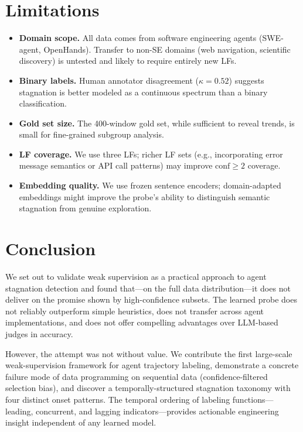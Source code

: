 \documentclass[11pt]{article}
\begin{document}
\section{Limitations}
\label{sec:limitations}

\begin{itemize}
\item \textbf{Domain scope.} All data comes from software engineering agents (SWE-agent, OpenHands). Transfer to non-SE domains (web navigation, scientific discovery) is untested and likely to require entirely new LFs.
\item \textbf{Binary labels.} Human annotator disagreement ($\kappa\!=\!0.52$) suggests stagnation is better modeled as a continuous spectrum than a binary classification.
\item \textbf{Gold set size.} The 400-window gold set, while sufficient to reveal trends, is small for fine-grained subgroup analysis.
\item \textbf{LF coverage.} We use three LFs; richer LF sets (e.g., incorporating error message semantics or API call patterns) may improve $\text{conf}\!\geq\!2$ coverage.
\item \textbf{Embedding quality.} We use frozen sentence encoders; domain-adapted embeddings might improve the probe's ability to distinguish semantic stagnation from genuine exploration.
\end{itemize}

\section{Conclusion}
\label{sec:conclusion}

We set out to validate weak supervision as a practical approach to agent stagnation detection and found that---on the full data distribution---it does not deliver on the promise shown by high-confidence subsets.
The learned probe does not reliably outperform simple heuristics, does not transfer across agent implementations, and does not offer compelling advantages over LLM-based judges in accuracy.

However, the attempt was not without value.
We contribute the first large-scale weak-supervision framework for agent trajectory labeling, demonstrate a concrete failure mode of data programming on sequential data (confidence-filtered selection bias), and discover a temporally-structured stagnation taxonomy with four distinct onset patterns.
The temporal ordering of labeling functions---leading, concurrent, and lagging indicators---provides actionable engineering insight independent of any learned model.
\end{document}
